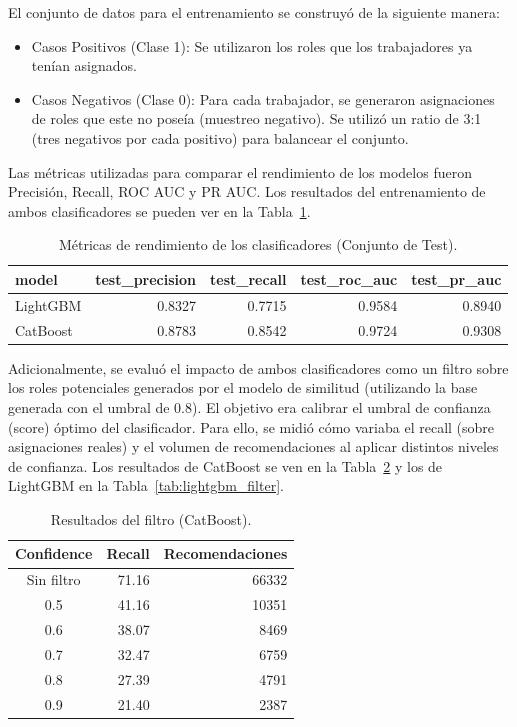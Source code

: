 \documentclass[11pt,letterpaper]{article}
\begin{document}
\begin{itemize}
El conjunto de datos para el entrenamiento se construyó de la siguiente
manera:

\begin{itemize}
\item
  Casos Positivos (Clase 1): Se utilizaron los roles que los
  trabajadores ya tenían asignados.
\item
  Casos Negativos (Clase 0): Para cada trabajador, se generaron
  asignaciones de roles que este no poseía (muestreo negativo). Se
  utilizó un ratio de 3:1 (tres negativos por cada positivo) para
  balancear el conjunto.
\end{itemize}

Las métricas utilizadas para comparar el rendimiento de los modelos
fueron Precisión, Recall, ROC AUC y PR AUC. Los resultados del
entrenamiento de ambos clasificadores se pueden ver en la Tabla~\ref{tab:clf_metrics}.

\begin{table}[h!]
    \centering
    \caption{Métricas de rendimiento de los clasificadores (Conjunto de Test).}
    \label{tab:clf_metrics}
    \begin{tabular}{@{}lrrrr@{}}
        \toprule
        model & test\_precision & test\_recall & test\_roc\_auc & test\_pr\_auc \\
        \midrule
        LightGBM & 0.8327 & 0.7715 & 0.9584 & 0.8940 \\
        CatBoost & 0.8783 & 0.8542 & 0.9724 & 0.9308 \\
        \bottomrule
    \end{tabular}
\end{table}

Adicionalmente, se evaluó el impacto de ambos clasificadores como un
filtro sobre los roles potenciales generados por el modelo de similitud
(utilizando la base generada con el umbral de 0.8). El objetivo era
calibrar el umbral de confianza (score) óptimo del clasificador. Para
ello, se midió cómo variaba el recall (sobre asignaciones reales) y el
volumen de recomendaciones al aplicar distintos niveles de confianza.
Los resultados de CatBoost se ven en la Tabla~\ref{tab:catboost_filter}
y los de LightGBM en la Tabla~\ref{tab:lightgbm_filter}.

\begin{table}[h!]
    \centering
    \caption{Resultados del filtro (CatBoost).}
    \label{tab:catboost_filter}
    \begin{tabular}{@{}crr@{}}
        \toprule
        Confidence & Recall & Recomendaciones \\
        \midrule
        Sin filtro & 71.16 & 66332 \\
        0.5 & 41.16 & 10351 \\
        0.6 & 38.07 & 8469 \\
        0.7 & 32.47 & 6759 \\
        0.8 & 27.39 & 4791 \\
        0.9 & 21.40 & 2387 \\
        \bottomrule
    \end{tabular}
\end{table}


\end{itemize}
\end{document}

